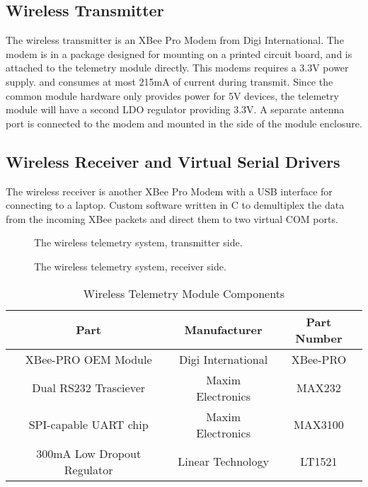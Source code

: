 \subsection{Wireless Transmitter}

The wireless transmitter is an XBee Pro Modem from Digi International. The modem is in a package designed for mounting on a printed circuit board, and is attached to the telemetry module directly. This modems requires a 3.3V power supply. and consumes at most 215mA of current during transmit. Since the common module hardware only provides power for 5V devices, the telemetry module will have a second LDO regulator providing 3.3V. A separate antenna port is connected to the modem and mounted in the side of the module enclosure.

\subsection{Wireless Receiver and Virtual Serial Drivers}

The wireless receiver is another XBee Pro Modem with a USB interface for connecting to a laptop. Custom software written in C to demultiplex the data from the incoming XBee packets and direct them to two virtual COM ports.

  \begin{figure}[H]
    \centering
      
    \caption{The wireless telemetry system, transmitter side.\label{fig:tele_tx_overview}}
  \end{figure}

  \begin{figure}[H]
    \centering
      
    \caption{The wireless telemetry system, receiver side.\label{fig:tele_rx_overview}}
  \end{figure}

  \begin{table}[H]
    \caption{Wireless Telemetry Module Components\label{tab:Wireless-Telemetry-Module}}
    \centering
      \begin{tabular}{|c|c|c|}
	\hline 
	Part & Manufacturer & Part Number\tabularnewline
	\hline
	\hline
	XBee-PRO OEM Module & Digi International & XBee-PRO\tabularnewline
	\hline 
	Dual RS232 Trasciever & Maxim Electronics & MAX232\tabularnewline
	\hline 
	SPI-capable UART chip & Maxim Electronics & MAX3100\tabularnewline
	\hline 
	300mA Low Dropout Regulator & Linear Technology & LT1521\tabularnewline
	\hline
      \end{tabular}
  \end{table}

